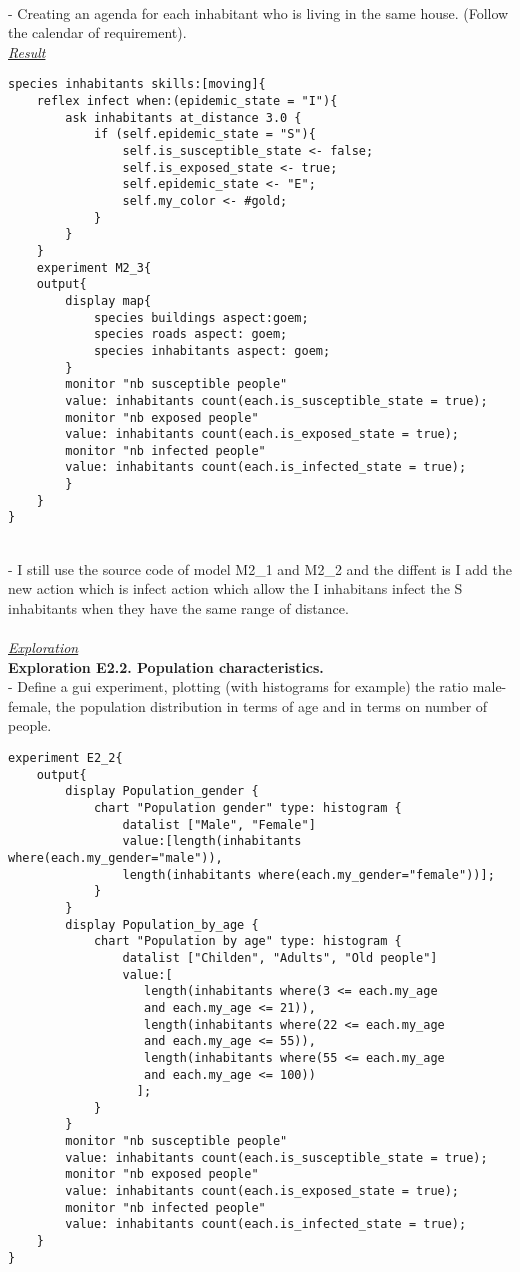 \documentclass{article}
\begin{document}
\\
- Creating an agenda for each inhabitant who is living in the same house. (Follow the calendar of requirement).
\\
\underline{\emph{Result}}\\
\begin{lstlisting}
species inhabitants skills:[moving]{
	reflex infect when:(epidemic_state = "I"){
		ask inhabitants at_distance 3.0 {
			if (self.epidemic_state = "S"){
				self.is_susceptible_state <- false;
				self.is_exposed_state <- true;
				self.epidemic_state <- "E";
				self.my_color <- #gold;
			}
		}
	}
	experiment M2_3{
	output{
		display map{
			species buildings aspect:goem;
			species roads aspect: goem;
			species inhabitants aspect: goem;
		}
		monitor "nb susceptible people" 
		value: inhabitants count(each.is_susceptible_state = true);
		monitor "nb exposed people" 
		value: inhabitants count(each.is_exposed_state = true);
		monitor "nb infected people" 
		value: inhabitants count(each.is_infected_state = true);
		}
	}
}
\end{lstlisting}
\\- I still use the source code of model M2\_1 and M2\_2 and the diffent is I add the new action which is infect action which allow the I inhabitans infect the S inhabitants when they have the same range of distance.
\\\\
\underline{\emph{Exploration}}
\\
\textbf{Exploration E2.2. Population characteristics.}
\\- Define a gui experiment, plotting (with histograms for example) the ratio male-female, the population distribution in terms of age and in terms on number of people.
\begin{lstlisting}
experiment E2_2{
	output{
		display Population_gender {
			chart "Population gender" type: histogram {
				datalist ["Male", "Female"] 
				value:[length(inhabitants where(each.my_gender="male")), 
				length(inhabitants where(each.my_gender="female"))];
			}								
		}
		display Population_by_age {
			chart "Population by age" type: histogram {
				datalist ["Childen", "Adults", "Old people"] 
				value:[
				   length(inhabitants where(3 <= each.my_age 
				   and each.my_age <= 21)),
				   length(inhabitants where(22 <= each.my_age 
				   and each.my_age <= 55)), 
				   length(inhabitants where(55 <= each.my_age 
				   and each.my_age <= 100))
				  ];
			}
		}
		monitor "nb susceptible people" 
		value: inhabitants count(each.is_susceptible_state = true);
		monitor "nb exposed people" 
		value: inhabitants count(each.is_exposed_state = true);
		monitor "nb infected people" 
		value: inhabitants count(each.is_infected_state = true);
	}
}
\end{lstlisting}
\end{document}
